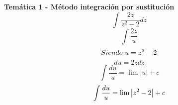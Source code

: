 

\textbf{Temática 1 - Método integración por sustitución}
\[\int \frac{2z}{z^2-2}dz\]
\[\int \frac{2z}{u}\]
\[Siendo \ u=z^2-2\]
\[du=2zdz\]
\[\int \frac{du}{u}=\lim \left|u\right|+c\]
\[\int \frac{du}{u}=\lim \left|z^2-2\right|+c\]
